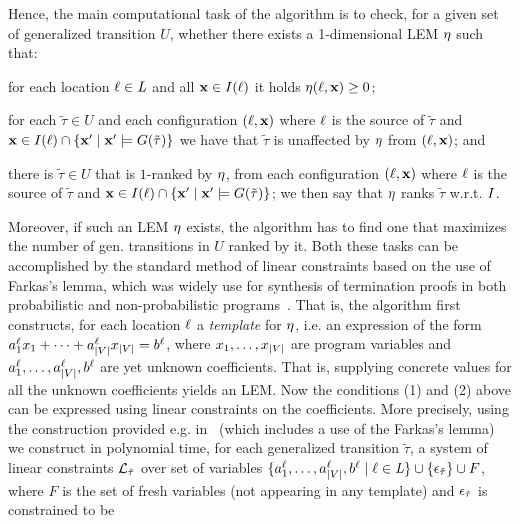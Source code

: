 Hence, the main computational task of the algorithm is to check, for a given set of generalized transition $U$, whether there exists a 1-dimensional LEM $\eta$ such that:
\begin{compactenum}
\item for each location $\ell\in\mathit{L}$ and all $\mathbf{x}\in I(\ell)$ it holds $\eta(\ell,\mathbf{x})\geq 0$;
\item for each $\tilde{\tau}\in U$ and  each configuration $(\ell,\mathbf{x})$ where $\ell$ is the source of $\tilde{\tau}$ and $\mathbf{x}\in I(\ell)\cap\{\mathbf{x}'\mid \mathbf{x}'\models G(\tilde{\tau})\}$ we have that $\tilde{\tau}$ is unaffected by $\eta$ from $(\ell,\mathbf{x})$; and
\item there is $\tilde{\tau}\in U$ that is $1$-ranked by $\eta$, from each configuration $(\ell,\mathbf{x})$ where $\ell$ is the source of $\tilde{\tau}$ and $\mathbf{x}\in I(\ell)\cap\{\mathbf{x}'\mid \mathbf{x}'\models G(\tilde{\tau})\}$; we then say that $\eta$ ranks $\tilde{\tau}$ w.r.t. $I$.
\end{compactenum}
  Moreover, if such an LEM $\eta$ exists, the algorithm has to find one that 
  maximizes the number of gen. transitions in $U$ ranked by it. Both these 
  tasks can be accomplished by the standard  method of linear constraints based 
  on the use of Farkas's lemma, which was widely use for synthesis of 
  termination proofs in both probabilistic and non-probabilistic 
  programs~\cite{DBLP:conf/tacas/ColonS01,DBLP:conf/vmcai/PodelskiR04,SriramCAV,CFNH16:prob-termination}.
   That is, the algorithm first constructs, for each location $\ell$ a 
  \emph{template} for $\eta$, i.e. an expression of the form $a_1^{\ell}x_1 + 
  \cdots + a_{|V|}^{\ell}x_{|V|} = b^{\ell} $, where 
  $x_1,\dots,x_{|V|}$ are program variables and 
  $a_1^{\ell},\dots,a_{|V|}^{\ell},b^{\ell} $ are yet unknown 
  coefficients. That is, supplying concrete values for all the unknown 
  coefficients yields an LEM. Now the conditions (1) and (2) above can be 
  expressed using linear constraints on the coefficients. More precisely, using 
  the construction provided e.g. in~\cite{SriramCAV,CFNH16:prob-termination} 
  (which includes a use of the Farkas's lemma) we construct in polynomial time, 
  for each generalized transition $\tilde{\tau}$, a system of linear 
  constraints $\mathcal{L}_{\tilde{\tau}}$ over set of variables $\{ 
  a_1^{\ell},\dots,a_{|V|}^{\ell},b^{\ell}\mid \ell\in\mathit{L} \}\cup 
  \{\epsilon_{\tilde\tau}\}\cup F$, where $F$ is the set of fresh variables (not 
  appearing in any template) and $\epsilon_{\tilde\tau} $ is constrained to be 
